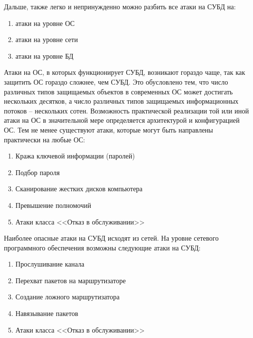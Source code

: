 Дальше, также легко и непринужденно можно разбить все атаки на СУБД на:
\begin{enumerate}
	\item атаки на уровне ОС
	\item атаки на уровне сети
	\item атаки на уровне БД
\end{enumerate}
Атаки на ОС, в которых функционирует СУБД, возникают гораздо чаще, так как защитить ОС гораздо сложнее, чем СУБД. Это обусловлено тем, что число различных типов защищаемых объектов в современных ОС может достигать нескольких десятков, а число различных типов защищаемых информационных потоков -- нескольких сотен. Возможность практической реализации той или иной атаки на ОС в значительной мере определяется архитектурой и конфигурацией ОС. Тем не менее существуют атаки, которые могут быть направлены практически на любые ОС:
\begin{enumerate}
	\item Кража ключевой информации (паролей)
	\item Подбор пароля
	\item Сканирование жестких дисков компьютера
	\item Превышение полномочий
	\item Атаки класса <<Отказ в обслуживании>>
\end{enumerate}
Наиболее опасные атаки на СУБД исходят из сетей. На уровне сетевого
программного обеспечения возможны следующие атаки на СУБД:
\begin{enumerate}
	\item Прослушивание канала
	\item Перехват пакетов на маршрутизаторе
	\item Создание ложного маршрутизатора
	\item Навязывание пакетов
	\item Атаки класса <<Отказ в обслуживании>>
\end{enumerate}


